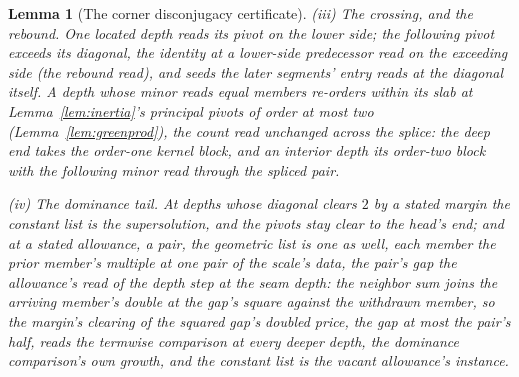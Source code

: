 \documentclass[11pt]{article}
\newtheorem{lemma}{Lemma}
\theoremstyle{definition}
\begin{document}
\begin{lemma}[The corner disconjugacy certificate]
\emph{(iii) The crossing, and the rebound.} One located depth
reads its pivot on the lower side; the following pivot exceeds
its diagonal, the identity at a lower-side predecessor read on the
exceeding side (the rebound read), and seeds the later
segments' entry reads at the diagonal itself. A depth whose minor
reads equal members re-orders within its slab at
Lemma~\ref{lem:inertia}'s principal pivots of order at most two
(Lemma~\ref{lem:greenprod}), the count read unchanged across the
splice: the deep end takes the order-one kernel block, and an
interior depth its order-two block with the following minor read
through the spliced pair.

\emph{(iv) The dominance tail.} At depths whose diagonal clears
$2$ by a stated margin the constant list is the supersolution, and
the pivots stay clear to the head's end; and at a stated
\emph{allowance}, a pair, the \emph{geometric list} is one as well, each
member the prior member's multiple at one pair of the scale's
data, the pair's gap the allowance's read of the depth step at the
seam depth: the neighbor sum joins the arriving member's double at
the gap's square against the withdrawn member, so the margin's
clearing of the squared gap's doubled price, the gap at most the
pair's half, reads the termwise comparison at every deeper depth,
the dominance comparison's own growth, and the constant list is
the vacant allowance's instance.


\end{lemma}
\end{document}
